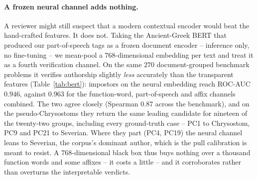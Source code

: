 \documentclass{anthology-ch}
\begin{document}
\paragraph{A frozen neural channel adds nothing.} A reviewer might still suspect that a modern contextual encoder would beat the hand-crafted features. It does not. Taking the Ancient-Greek BERT that produced our part-of-speech tags \cite{superpeitho} as a frozen document encoder -- inference only, no fine-tuning -- we mean-pool a $768$-dimensional embedding per text and treat it as a fourth verification channel. On the same $270$ document-grouped benchmark problems it verifies authorship slightly \emph{less} accurately than the transparent features (Table~\ref{tab:bert}): impostors on the neural embedding reach ROC-AUC $0.946$, against $0.963$ for the function-word, part-of-speech and affix channels combined. The two agree closely (Spearman $0.87$ across the benchmark), and on the pseudo-Chrysostoms they return the same leading candidate for nineteen of the twenty-two groups, including every ground-truth case -- PC1 to Chrysostom, PC9 and PC21 to Severian. Where they part (PC4, PC19) the neural channel leans to Severian, the corpus's dominant author, which is the pull calibration is meant to resist. A $768$-dimensional black box thus buys nothing over a thousand function words and some affixes -- it costs a little -- and it corroborates rather than overturns the interpretable verdicts.

\begin{table}[t]
  \centering
  \small
  
  \caption{A frozen Ancient-Greek BERT, used inference-only as a fourth channel, on the $270$-problem document-grouped benchmark. Impostors on the neural embedding do not improve on the hand-crafted channels.}
  \label{tab:bert}
\end{table}

\begin{table}[t]
  \centering
  \small
  
  \caption{Ground-truth groups. SL is the statistical likelihood (fraction of the bootstrapped distance-difference distribution favouring the candidate), with a 95\% bootstrap confidence interval. The verifier is correct for all three groups whose true author is a candidate (\checkmark); PC4 and PC12 have their true authors absent from the reference.}
  \label{tab:groundtruth}
\end{table}
\end{document}
